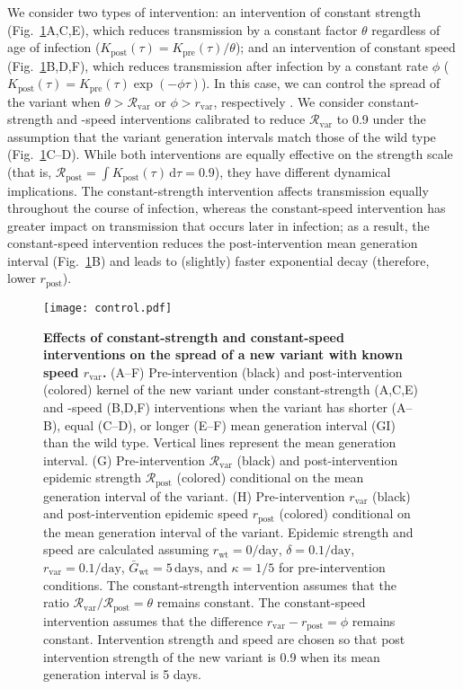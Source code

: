 \documentclass[12pt]{article}
\newcommand{\fref}[1]{Fig.~\ref{fig:#1}}
\newcommand{\vvvar}{\mathrm{var}}
\newcommand{\wwwt}{\mathrm{wt}}
\newcommand{\rx}[1]{\ensuremath{{r}_{#1}}\xspace}
\newcommand{\ry}[1]{\rx{\mathrm{#1}}}
\newcommand{\rw}{\rx{\wwwt}}
\newcommand{\rv}{\rx{\vvvar}}
\newcommand{\Rx}[1]{\ensuremath{{\mathcal R}_{#1}}\xspace}
\newcommand{\Ry}[1]{\Rx{\mathrm{#1}}}
\newcommand{\Rv}{\Rx{\vvvar}}
\newcommand{\pday}{\ensuremath{/\textrm{day}}}
\newcommand{\dd}[1]{\ensuremath{\, \mathrm{d}#1}}
\newcommand{\dtau}{\dd{\tau}}
\newcommand{\Gx}[1]{\ensuremath{{\bar G}_{#1}}\xspace}
\newcommand{\Gy}[1]{\Gx{\mathrm{#1}}}
\begin{document}
We consider two types of intervention:
an intervention of constant strength (\fref{strengthspeed}A,C,E), which reduces transmission by a constant factor $\theta$ regardless of age of infection ($K_{\mathrm{post}}(\tau) = K_{\mathrm{pre}}(\tau)/\theta$); and an intervention of constant speed (\fref{strengthspeed}B,D,F), which reduces transmission after infection by a constant rate $\phi$ ($K_{\mathrm{post}}(\tau) = K_{\mathrm{pre}}(\tau) \exp(-\phi \tau)$).
In this case, we can control the spread of the variant when $\theta > \Rv$ or $\phi > \rv$, respectively \citep{doi:10.1098/rspb.2020.1556}.
We consider constant-strength and -speed interventions calibrated to reduce $\Rv$ to 0.9 under the assumption that the variant generation intervals match those of the wild type (\fref{strengthspeed}C--D).
While both interventions are equally effective on the strength scale (that is, $\Ry{post}=\int  K_{\mathrm{post}}(\tau) \dtau = 0.9$), they have different dynamical implications.
The constant-strength intervention affects transmission equally throughout the course of infection, whereas the constant-speed intervention has greater impact on transmission that occurs later in infection;
as a result, the constant-speed intervention reduces the post-intervention mean generation interval (\fref{strengthspeed}B) and leads to (slightly) faster exponential decay (therefore, lower $\ry{post}$).

\begin{figure}[!pth]
\begin{center}
\texttt{[image: control.pdf]}
\caption{
\textbf{Effects of constant-strength and constant-speed interventions on the spread of a new variant with known speed \rv.}
(A--F) Pre-intervention (black) and post-intervention (colored) kernel of the new variant under constant-strength (A,C,E) and -speed (B,D,F) interventions when the variant has shorter (A--B), equal (C--D), or longer (E--F) mean generation interval (GI) than the wild type.
Vertical lines represent the mean generation interval.
(G) Pre-intervention $\Rv$ (black) and post-intervention epidemic strength $\Ry{post}$ (colored) conditional on the mean generation interval of the variant.
(H) Pre-intervention $\rv$ (black) and post-intervention epidemic speed $\ry{post}$ (colored) conditional on the mean generation interval of the variant.
Epidemic strength and speed are calculated assuming $\rw=0\pday$, $\delta=0.1\pday$, $\rv=0.1\pday$, $\Gy{wt}=5\,\textrm{days}$, and $\kappa=1/5$ for pre-intervention conditions.
The constant-strength intervention assumes that the ratio $\Rv/\Ry{post} = \theta$ remains constant.
The constant-speed intervention assumes that the difference $\rv - \ry{post} = \phi$ remains constant.
Intervention strength and speed are chosen so that post intervention strength of the new variant is 0.9 when its mean generation interval is 5 days.
}
\label{fig:strengthspeed}
\end{center}
\end{figure}
\end{document}
